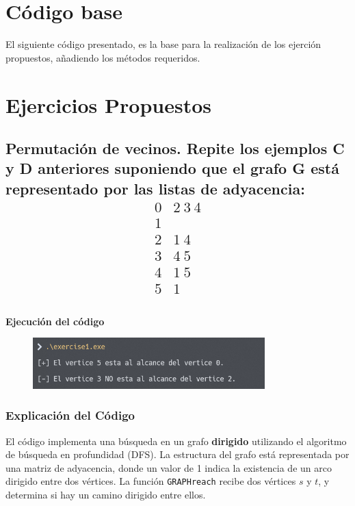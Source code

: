 \documentclass{article}
\begin{document}
\section{Código base}
    El siguiente código presentado, es la base para la realización de los ejerción propuestos, añadiendo los métodos requeridos. \\
    

\section{Ejercicios Propuestos}
    \subsection{Permutación de vecinos. Repite los ejemplos C y D anteriores suponiendo que el grafo G está representado por las listas de adyacencia:
            \[
            \begin{array}{r|l}
            0 & 2 \ 3 \ 4 \\
            1 & \\
            2 & 1 \ 4 \\
            3 & 4 \ 5 \\
            4 & 1 \ 5 \\
            5 & 1 \\
            \end{array}
            \]
    }

        

        \textbf{Ejecución del código}
            \begin{figure}[H]
            	\centering
             	\includegraphics[width=0.8\textwidth,keepaspectratio]{img/exercise1.png}
            \end{figure}

        \subsubsection*{Explicación del Código}
            El código implementa una búsqueda en un grafo \textbf{dirigido} utilizando el algoritmo de búsqueda en profundidad (DFS). La estructura del grafo está representada por una matriz de adyacencia, donde un valor de 1 indica la existencia de un arco dirigido entre dos vértices. La función \texttt{GRAPHreach} recibe dos vértices \( s \) y \( t \), y determina si hay un camino dirigido entre ellos.
            
\end{document}
